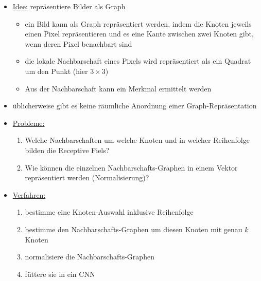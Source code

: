 \begin{itemize}
  \item \underline{Idee:} repräsentiere Bilder als Graph
    \begin{itemize}
      \item ein Bild kann als Graph repräsentiert werden, indem die Knoten jeweils einen Pixel repräsentieren und es eine Kante zwischen zwei Knoten gibt, wenn deren Pixel benachbart sind
      \item die lokale Nachbarschaft eines Pixels wird repräsentiert als ein Quadrat um den Punkt (hier $3 \times 3$)
      \item Aus der Nachbarschaft kann ein Merkmal ermittelt werden
    \end{itemize}
  \item üblicherweise gibt es keine räumliche Anordnung einer Graph-Repräsentation
  \item \underline{Probleme:}
    \begin{enumerate}
      \item Welche Nachbarschaften um welche Knoten und in welcher Reihenfolge bilden die Receptive Fiels?
      \item Wie können die einzelnen Nachbarschafts-Graphen in einem Vektor repräsentiert werden (Normalisierung)?
    \end{enumerate}
  \item \underline{Verfahren:}
    \begin{enumerate}
      \item bestimme eine Knoten-Auswahl inklusive Reihenfolge
      \item bestimme den Nachbarschafts-Graphen um diesen Knoten mit genau $k$ Knoten
      \item normalisiere die Nachbarschafts-Graphen
      \item füttere sie in ein CNN
    \end{enumerate}
\end{itemize}
